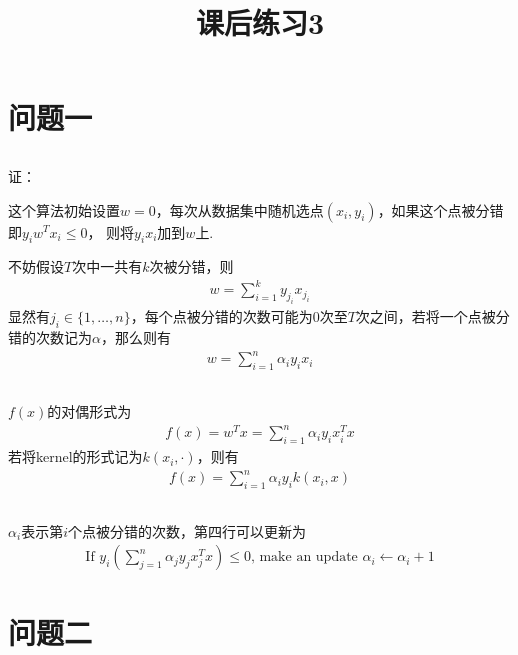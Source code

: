 \documentclass[12pt, a4paper]{article}
\title{课后练习3}
\author{}
\date{}
\begin{document}
\maketitle %

\section{问题一}

\subsection{}

证：

这个算法初始设置$w=0$，每次从数据集中随机选点$(x_i,y_i)$，如果这个点被分错即$y_iw^Tx_i\leq 0$，
则将$y_ix_i$加到$w$上. 

不妨假设$T$次中一共有$k$次被分错，则
\begin{align*}
    w=\sum_{i=1}^{k}y_{j_i}x_{j_i}
\end{align*}
显然有$j_i\in \{1,\dots,n\}$，每个点被分错的次数可能为0次至$T$次之间，若将一个点被分错的次数记为$\alpha$，那么则有
\begin{align*}
    w=\sum_{i=1}^{n}\alpha_i y_i x_i
\end{align*}

\subsection{}

$f(x)$的对偶形式为
\begin{align*}
    f(x)=w^Tx=\sum_{i=1}^{n}\alpha_i y_i x_i^Tx
\end{align*}
若将kernel的形式记为$k(x_i,\cdot)$，则有
\begin{align*}
    f(x)=\sum_{i=1}^{n}\alpha_i y_i k(x_i,x)
\end{align*}

\subsection{}

$\alpha_i$表示第$i$个点被分错的次数，第四行可以更新为
\begin{align*}
    \text{If }y_i(\sum_{j=1}^{n}\alpha_j y_j x_j^Tx)\leq 0
    \text{, make an update } \alpha_i \leftarrow \alpha_i+1
\end{align*}

\section{问题二}
\end{document}
